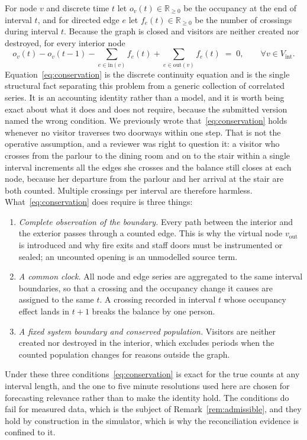 \documentclass[11pt]{article}
\theoremstyle{plain}
\theoremstyle{definition}
\theoremstyle{remark}
\newcommand{\Rb}{\mathbb{R}}
\newif\ifrevisionmarkup
\newcommand{\new}[1]{\ifrevisionmarkup\textcolor{revision}{#1}\else#1\fi}
\begin{document}
For node $v$ and discrete time $t$ let $o_v(t) \in \Rb_{\ge 0}$ be the occupancy at the end of interval $t$, and for directed edge $e$ let $f_e(t) \in \Rb_{\ge 0}$ be the number of crossings during interval $t$. Because the graph is closed and visitors are neither created nor destroyed, for every interior node
\begin{equation}
o_v(t) - o_v(t-1) - \sum_{e \in \mathrm{in}(v)} f_e(t) + \sum_{e \in \mathrm{out}(v)} f_e(t) \;=\; 0,
\qquad \forall v \in V_{\mathrm{int}}.
\label{eq:conservation}
\end{equation}
Equation~\eqref{eq:conservation} is the discrete continuity equation and is the single structural fact separating this problem from a generic collection of correlated series. \new{It is an accounting identity rather than a model, and it is worth being exact about what it does and does not require, because the submitted version named the wrong condition. We previously wrote that~\eqref{eq:conservation} holds whenever no visitor traverses two doorways within one step. That is not the operative assumption, and a reviewer was right to question it: a visitor who crosses from the parlour to the dining room and on to the stair within a single interval increments all the edges she crosses and the balance still closes at each node, because her departure from the parlour and her arrival at the stair are both counted. Multiple crossings per interval are therefore harmless. What~\eqref{eq:conservation} does require is three things:}
\new{\begin{enumerate}
\item \emph{Complete observation of the boundary.} Every path between the interior and the exterior passes through a counted edge. This is why the virtual node $v_{\mathrm{out}}$ is introduced and why fire exits and staff doors must be instrumented or sealed; an uncounted opening is an unmodelled source term.
\item \emph{A common clock.} All node and edge series are aggregated to the same interval boundaries, so that a crossing and the occupancy change it causes are assigned to the same $t$. A crossing recorded in interval $t$ whose occupancy effect lands in $t+1$ breaks the balance by one person.
\item \emph{A fixed system boundary and conserved population.} Visitors are neither created nor destroyed in the interior, which excludes periods when the counted population changes for reasons outside the graph.
\end{enumerate}}
\new{Under these three conditions~\eqref{eq:conservation} is exact for the true counts at any interval length, and the one to five minute resolutions used here are chosen for forecasting relevance rather than to make the identity hold. The conditions do fail for measured data, which is the subject of Remark~\ref{rem:admissible}, and they hold by construction in the simulator, which is why the reconciliation evidence is confined to it.}
\end{document}
